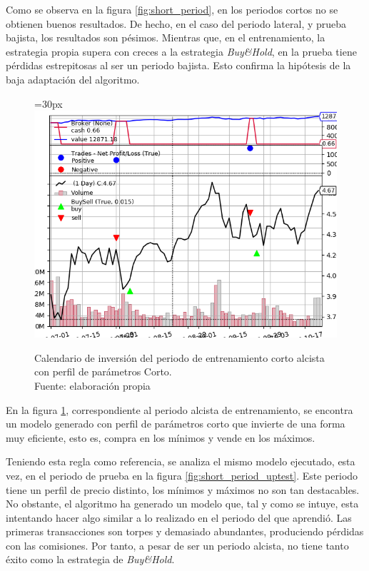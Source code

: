 Como se observa en la figura \ref{fig:short_period}, en los periodos cortos no se obtienen buenos resultados. De hecho, en el caso del periodo lateral, y prueba bajista, los resultados son p\'esimos. Mientras que, en el entrenamiento, la estrategia propia supera con creces a la estrategia \textit{Buy\&Hold}, en la prueba tiene p\'erdidas estrepitosas al ser un periodo bajista. Esto confirma la hip\'otesis de la baja adaptaci\'on del algoritmo.

     	\begin{figure}[H]
     		\centering\leftskip=30px
     		\includegraphics[scale=0.70]{imagenes/S_Short_train.png}
     		\caption[Calendario de inversi\'on del periodo de entrenamiento corto alcista.]{Calendario de inversi\'on del periodo de entrenamiento corto alcista con perfil de par\'ametros Corto.\\ Fuente: elaboraci\'on propia}
     		\label{fig:short_period_uptrain}
     	\end{figure}
     	
En la figura \ref{fig:short_period_uptrain}, correspondiente al periodo alcista de entrenamiento, se encontra un modelo generado con perfil de par\'ametros corto que invierte de una forma muy eficiente, esto es, compra en los m\'inimos y vende en los m\'aximos. 

Teniendo esta regla como referencia, se analiza el mismo modelo ejecutado, esta vez, en el periodo de prueba en la figura \ref{fig:short_period_uptest}. Este periodo tiene un perfil de precio distinto, los m\'inimos y m\'aximos no son tan destacables. No obstante, el algoritmo ha generado un modelo que, tal y como se intuye, esta intentando hacer algo similar a lo realizado en el periodo del que aprendi\'o. Las primeras transacciones son torpes y demasiado abundantes, produciendo p\'erdidas con las comisiones.	Por tanto, a pesar de ser un periodo alcista, no tiene tanto \'exito como la estrategia de \textit{Buy\&Hold}.
     	
